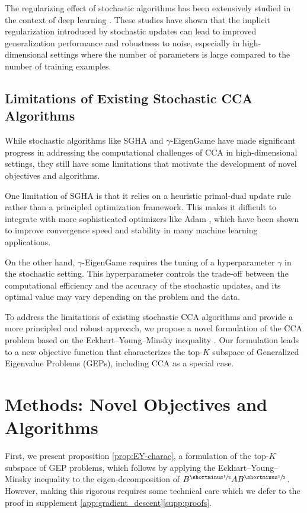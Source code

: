 The regularizing effect of stochastic algorithms has been extensively studied in the context of deep learning \citep{zhang2021understanding,chaudhari2018stochastic}. These studies have shown that the implicit regularization introduced by stochastic updates can lead to improved generalization performance and robustness to noise, especially in high-dimensional settings where the number of parameters is large compared to the number of training examples.

\subsection{Limitations of Existing Stochastic CCA Algorithms}
While stochastic algorithms like SGHA and $\gamma$-EigenGame have made significant progress in addressing the computational challenges of CCA in high-dimensional settings, they still have some limitations that motivate the development of novel objectives and algorithms.

One limitation of SGHA is that it relies on a heuristic primal-dual update rule rather than a principled optimization framework. This makes it difficult to integrate with more sophisticated optimizers like Adam \citep{kingma2014adam}, which have been shown to improve convergence speed and stability in many machine learning applications.

On the other hand, $\gamma$-EigenGame requires the tuning of a hyperparameter $\gamma$ in the stochastic setting. This hyperparameter controls the trade-off between the computational efficiency and the accuracy of the stochastic updates, and its optimal value may vary depending on the problem and the data.

To address the limitations of existing stochastic CCA algorithms and provide a more principled and robust approach, we propose a novel formulation of the CCA problem based on the Eckhart--Young--Minsky inequality \citep{stewart_matrix_1990}. Our formulation leads to a new objective function that characterizes the top-$K$ subspace of Generalized Eigenvalue Problems (GEPs), including CCA as a special case.

\section{Methods: Novel Objectives and Algorithms}\label{sec:contributions}

First, we present proposition \ref{prop:EY-charac}, a formulation of the top-$K$ subspace of GEP problems, which follows by applying the Eckhart--Young--Minsky inequality \citep{stewart_matrix_1990} to the eigen-decomposition of $B^\mhalf A B^\mhalf$. However, making this rigorous requires some technical care which we defer to the proof in supplement \ref{app:gradient_descent}\ref{supp:proofs}.   

